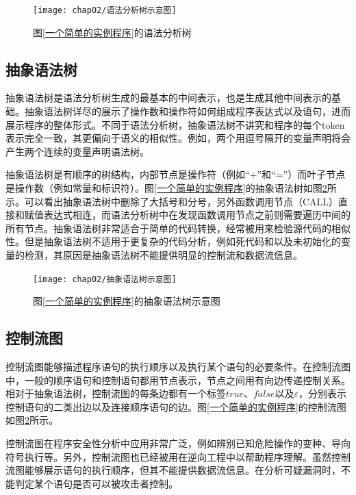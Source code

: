 \begin{figure}[htp]
\centering
\texttt{[image: chap02/语法分析树示意图]}
\caption{图\ref{一个简单的实例程序}的语法分析树}
\label{语法分析树示例}
\end{figure}

\subsection{抽象语法树}

抽象语法树是语法分析树生成的最基本的中间表示，也是生成其他中间表示的基础。抽象语法树详尽的展示了操作数和操作符如何组成程序表达式以及语句，进而展示程序的整体形式。不同于语法分析树，抽象语法树不讲究和程序的每个token表示完全一致，其更偏向于语义的相似性。例如，两个用逗号隔开的变量声明将会产生两个连续的变量声明语法树。

抽象语法树是有顺序的树结构，内部节点是操作符（例如“+”和“=”）而叶子节点是操作数（例如常量和标识符）。图\ref{一个简单的实例程序}的抽象语法树如图\ref{抽象语法树示意图}所示。可以看出抽象语法树中删除了大括号和分号，另外函数调用节点{（CALL）}直接和赋值表达式相连，而语法分析树中在发现函数调用节点之前则需要遍历中间的所有节点。抽象语法树非常适合于简单的代码转换，经常被用来检验源代码的相似性。但是抽象语法树不适用于更复杂的代码分析，例如死代码和以及未初始化的变量的检测，其原因是抽象语法树不能提供明显的控制流和数据流信息。


\begin{figure}[htp]
\centering
\texttt{[image: chap02/抽象语法树示意图]}
\caption{图\ref{一个简单的实例程序}的抽象语法树示意图}
\label{抽象语法树示意图}
\end{figure}

\subsection{控制流图}

控制流图能够描述程序语句的执行顺序以及执行某个语句的必要条件。在控制流图中，一般的顺序语句和控制语句都用节点表示，节点之间用有向边传递控制关系。相对于抽象语法树，控制流图的每条边都有一个标签$true$、$false$以及$\varepsilon$，分别表示控制语句的二类出边以及连接顺序语句的边。图\ref{一个简单的实例程序}的控制流图如图\ref{抽象语法树示意图}所示。

控制流图在程序安全性分析中应用非常广泛，例如辨别已知危险操作的变种、导向符号执行等。另外，控制流图也已经被用在逆向工程中以帮助程序理解。虽然控制流图能够展示语句的执行顺序，但其不能提供数据流信息。在分析可疑漏洞时，不能判定某个语句是否可以被攻击者控制。

